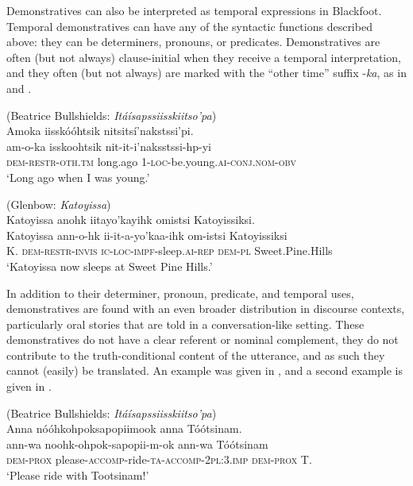 \documentclass[output=paper,colorlinks,citecolor=brown]{langscibook}
\begin{document}
Demonstratives can also be interpreted as temporal expressions in Blackfoot. Temporal demonstratives can have any of the syntactic functions described above: they can be determiners, pronouns, or predicates. Demonstratives are often (but not always) clause-initial when they receive a temporal interpretation, and they often (but not always) are marked with the “other time” suffix -\textit{ka}, as in  and .

\ea\label{ex:bliss:9} (Beatrice Bullshields: \textit{Itáísapssiisskiitso’pa})\\ 
{Amoka iisskóóhtsik nitsitsí’nakstssi’pi.}\\
\gll am-o-ka isskoohtsik nit-it-i’naksstssi-hp-yi\\
     \textsc{dem-restr-oth.tm} long.ago 1-\textsc{loc}-be.young.\textsc{ai-conj.nom-obv}\\
\glt ‘Long ago when I was young.’ 
\z

\ea\label{ex:bliss:10} (Glenbow: \textit{Katoyissa})\\
{Katoyissa anohk iitayo’kayihk omistsi Katoyissiksi.}\\
\gll Katoyissa ann-o-hk ii-it-a-yo’kaa-ihk om-istsi Katoyissiksi\\
     K. \textsc{dem-restr-invis} \textsc{ic-loc-impf-}sleep\textsc{.ai-rep} \textsc{dem-pl} Sweet.Pine.Hills\\
\glt ‘Katoyissa now sleeps at Sweet Pine Hills.’ 
\z

In addition to their determiner, pronoun, predicate, and temporal uses, demonstratives are found with an even broader distribution in discourse contexts, particularly oral stories that are told in a conversation-like setting. These demonstratives do not have a clear referent or nominal complement, they do not contribute to the truth-conditional content of the utterance, and as such they cannot (easily) be translated. An example was given in , and a second example is given in . 

\ea\label{ex:bliss:11} (Beatrice Bullshields: \textit{Itáísapssiisskiitso’pa})\\
{Anna nóóhkohpoksapopiimook anna Tóótsinam.}\\
\gll ann-wa noohk-ohpok-sapopii-m-ok ann-wa Tóótsinam\\
     \textsc{dem-prox} please-\textsc{accomp}-ride\textsc{-ta-accomp-2pl:3.imp} \textsc{dem-prox} T.\\
\glt ‘Please ride with Tootsinam!’ 
\z
\end{document}
